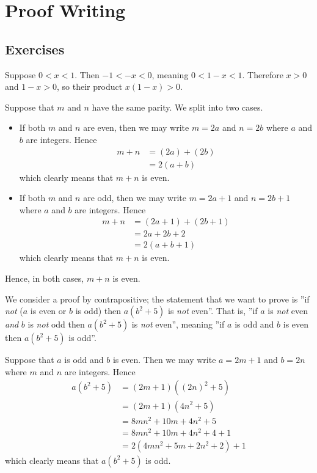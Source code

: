 \section{Proof Writing}
\subsection*{Exercises}
\begin{questions}
    \item Suppose $0 < x < 1$. Then $-1 < -x < 0$, meaning $0 < 1 - x < 1$. Therefore $x > 0$ and $1-x > 0$, so their product $x(1-x) > 0$.

    \item Suppose that $m$ and $n$ have the same parity. We split into two cases.
        \begin{itemize}
            \item If both $m$ and $n$ are even, then we may write $m = 2a$ and $n = 2b$ where $a$ and $b$ are integers. Hence
            \begin{align*}
                m + n &= (2a) + (2b) \\
                &= 2(a+b)
            \end{align*}
            which clearly means that $m + n$ is even.
            \item If both $m$ and $n$ are odd, then we may write $m = 2a + 1$ and $n = 2b + 1$ where $a$ and $b$ are integers. Hence
            \begin{align*}
                m + n &= (2a + 1) + (2b + 1)\\
                &= 2a + 2b + 2\\
                &= 2(a + b + 1)
            \end{align*}
            which clearly means that $m+n$ is even.
        \end{itemize}
    Hence, in both cases, $m + n$ is even.

    \item We consider a proof by contrapositive; the statement that we want to prove is ''if \textit{not} ($a$ is even or $b$ is odd) then $a(b^2+5)$ is \textit{not} even''. That is, ''if $a$ is \textit{not} even \textit{and} $b$ is \textit{not} odd then $a(b^2+5)$ is \textit{not} even'', meaning ''if $a$ is odd and $b$ is even then $a(b^2+5)$ is odd''.

    Suppose that $a$ is odd and $b$ is even. Then we may write $a = 2m + 1$ and $b = 2n$ where $m$ and $n$ are integers. Hence
    \begin{align*}
        a(b^2+5) &= (2m+1)\left((2n)^2 + 5\right)\\
        &= (2m+1)(4n^2 + 5)\\
        &= 8mn^2 + 10m + 4n^2 + 5\\
        &= 8mn^2 + 10m + 4n^2 + 4 + 1\\
        &= 2(4mn^2 + 5m + 2n^2 + 2) + 1
    \end{align*}
    which clearly means that $a(b^2+5)$ is odd.


\end{questions}
